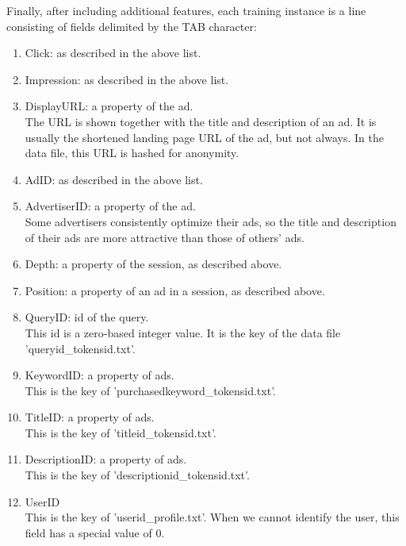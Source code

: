 \documentclass[10pt,a4paper]{ctexbook}
\begin{document}
Finally, after including additional features, each training instance is a line consisting of fields delimited by the TAB character: 
\begin{enumerate}
\item Click: as described in the above list. 

\item Impression: as described in the above list. 

\item DisplayURL: a property of the ad. \\
The URL is shown together with the title and description of an ad. It is usually the shortened landing page URL of the ad, but not always. In the data file,  this URL is hashed for anonymity. 

\item AdID: as described in the above list. 

\item AdvertiserID: a property of the ad. \\
Some advertisers consistently optimize their ads, so the title and description of their ads are more attractive than those of others' ads. 

\item Depth: a property of the session, as described above.   

\item Position: a property of an ad in a session, as described above. 

\item  QueryID:  id of the query. \\
This id is a zero‐based integer value. It is the key of the data file 'queryid\_tokensid.txt'.

\item KeywordID: a property of ads. \\
This is the key of  'purchasedkeyword\_tokensid.txt'. 

\item TitleID: a property of ads. \\
This is the key of 'titleid\_tokensid.txt'. 

\item DescriptionID: a property of ads. \\
This is the key of 'descriptionid\_tokensid.txt'. 

\item UserID \\
This is the key of 'userid\_profile.txt'.  When we cannot identify the user, this field has a special value of 0.
\end{enumerate}
\end{document}
